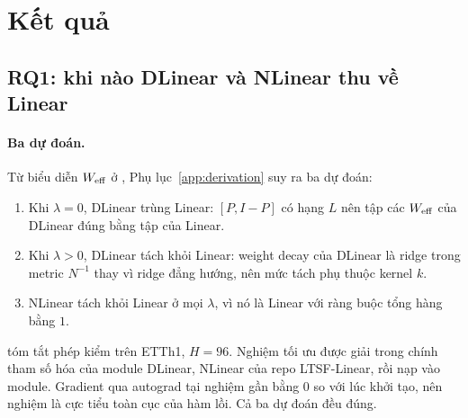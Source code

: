 \section{Kết quả}
\label{sec:results}

\subsection{RQ1: khi nào DLinear và NLinear thu về Linear}
\label{sec:rq1}

\paragraph{Ba dự đoán.} Từ biểu diễn $W_{\mathrm{eff}}$ ở , Phụ lục~\ref{app:derivation} suy ra ba dự đoán:
\begin{enumerate}[label=(\arabic*)]
    \item Khi $\lambda = 0$, DLinear trùng Linear: $[P, I - P]$ có hạng $L$ nên tập các $W_{\mathrm{eff}}$ của DLinear đúng bằng tập của Linear.
    \item Khi $\lambda > 0$, DLinear tách khỏi Linear: weight decay của DLinear là ridge trong metric $N^{-1}$ thay vì ridge đẳng hướng, nên mức tách phụ thuộc kernel $k$.
    \item NLinear tách khỏi Linear ở mọi $\lambda$, vì nó là Linear với ràng buộc tổng hàng bằng $1$.
\end{enumerate}

 tóm tắt phép kiểm trên ETTh1, $H = 96$. Nghiệm tối ưu được giải trong chính tham số hóa của module DLinear, NLinear của repo LTSF-Linear, rồi nạp vào module. Gradient qua autograd tại nghiệm gần bằng $0$ so với lúc khởi tạo, nên nghiệm là cực tiểu toàn cục của hàm lồi. Cả ba dự đoán đều đúng.

\begin{captionbelowboxaivn}
\label{tab:b2}
\end{captionbelowboxaivn}
\begin{center}
\small

\end{center}

